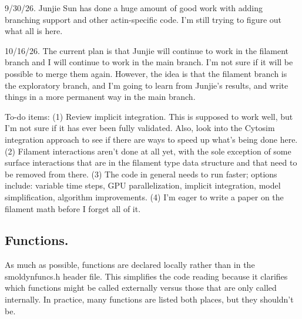 \documentclass {scrbook}
\begin{document}
9/30/26. Junjie Sun has done a huge amount of good work with adding branching support and other actin-specific code. I'm still trying to figure out what all is here.

10/16/26. The current plan is that Junjie will continue to work in the filament branch and I will continue to work in the main branch. I'm not sure if it will be possible to merge them again. However, the idea is that the filament branch is the exploratory branch, and I'm going to learn from Junjie's results, and write things in a more permanent way in the main branch.

To-do items: (1) Review implicit integration. This is supposed to work well, but I'm not sure if it has ever been fully validated. Also, look into the Cytosim integration approach to see if there are ways to speed up what's being done here. (2) Filament interactions aren't done at all yet, with the sole exception of some surface interactions that are in the filament type data structure and that need to be removed from there. (3) The code in general needs to run faster; options include: variable time steps, GPU parallelization, implicit integration, model simplification, algorithm improvements. (4) I'm eager to write a paper on the filament math before I forget all of it.

\subsection{Functions.}
As much as possible, functions are declared locally rather than in the smoldynfuncs.h header file. This simplifies the code reading because it clarifies which functions might be called externally versus those that are only called internally. In practice, many functions are listed both places, but they shouldn't be.
\end{document}
